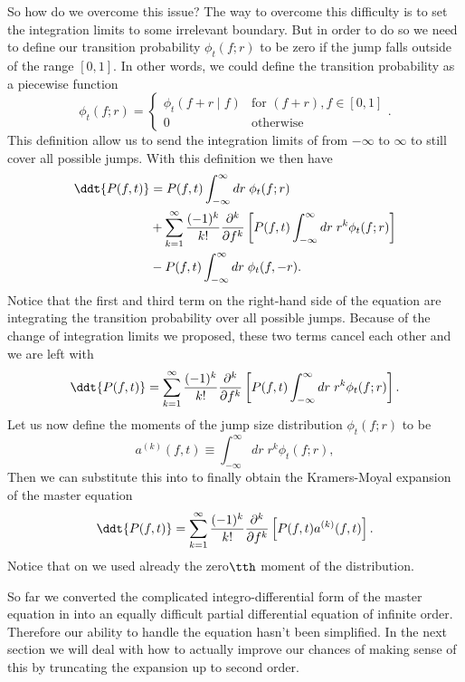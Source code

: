 So how do we overcome this issue? The way to overcome this difficulty is to
set the integration limits to some irrelevant boundary. But in order to do so
we need to define our transition probability $\phi_t(f; r)$ to be zero if the
jump falls outside of the range $[0, 1]$. In other words, we could define the
transition probability as a piecewise function
\begin{equation}
  \phi_t(f; r) =
  \begin{cases}
    \phi_t(f + r \mid f)& \text{for } (f + r), f \in [0, 1] \\
    0& \text{otherwise}
  \end{cases}.
\end{equation}
This definition allow us to send the integration limits of
 from $-\infty$ to $\infty$ to still cover all possible
jumps. With this definition we then have
\begin{align}
  \ddt{P(f, t)} &= P(f, t)\int^\infty_{- \infty} dr \; \phi_t(f; r) \\
  &+
  \sum_{k=1}^\infty {(-1)^k \over k!} {\partial^k \over \partial f^k}
  \left[
  P(f, t) \int_{-\infty}^\infty dr \; r^k \phi_t(f; r)
  \right] \\
  &-
  P(f, t) \int_{-\infty}^\infty dr \; \phi_t(f, -r).
\end{align}
Notice that the first and third term on the right-hand side of the equation are
integrating the transition probability over all possible jumps. Because of the
change of integration limits we proposed, these two terms cancel each other and
we are left with
\begin{equation}
  \ddt{P(f, t)} = \sum_{k=1}^\infty {(-1)^k \over k!}
  {\partial^k \over \partial f^k}
  \left[
  P(f, t) \int_{-\infty}^\infty dr \; r^k \phi_t(f; r)
  \right].
  \label{eq_almost_km}
\end{equation}
Let us now define the moments of the jump size distribution $\phi_t(f; r)$ to be
\begin{equation}
  a^{(k)}(f, t) \equiv \int_{-\infty}^\infty dr \; r^k \phi_t(f; r),
\end{equation}
Then we can substitute this into  to finally obtain the
Kramers-Moyal expansion of the master equation
\begin{equation}
  \ddt{P(f, t)} = \sum_{k=1}^\infty {(-1)^k \over k!}
  {\partial^k \over \partial f^k}
  \left[
  P(f, t) a^{(k)}(f, t)
  \right].
  \label{eq_km_expansion}
\end{equation}
Notice that on  we used already the zero$\tth$
moment of the distribution.

So far we converted the complicated integro-differential form of the master
equation in  into an equally difficult partial
differential equation of infinite order. Therefore our ability to handle the
equation hasn't been simplified. In the next section we will deal with how to
actually improve our chances of making sense of this by truncating the expansion
up to second order. 
